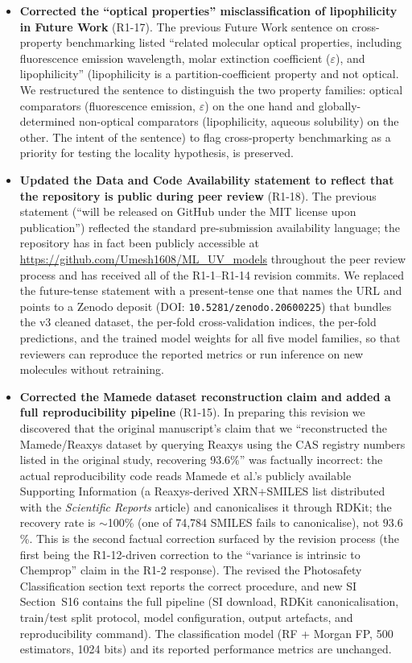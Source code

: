 \documentclass[11pt]{article}
\begin{document}
\begin{itemize}[leftmargin=2em]
 \item \textbf{Corrected the ``optical properties'' misclassification of lipophilicity in Future Work} (R1-17). The previous Future Work sentence on cross-property benchmarking listed ``related molecular optical properties, including fluorescence emission wavelength, molar extinction coefficient ($\varepsilon$), and lipophilicity'' (lipophilicity is a partition-coefficient property and not optical. We restructured the sentence to distinguish the two property families: optical comparators (fluorescence emission, $\varepsilon$) on the one hand and globally-determined non-optical comparators (lipophilicity, aqueous solubility) on the other. The intent of the sentence) to flag cross-property benchmarking as a priority for testing the locality hypothesis, is preserved.
  \item \textbf{Updated the Data and Code Availability statement to reflect that the repository is public during peer review} (R1-18). The previous statement (``will be released on GitHub under the MIT license upon publication'') reflected the standard pre-submission availability language; the repository has in fact been publicly accessible at \url{https://github.com/Umesh1608/ML_UV_models} throughout the peer review process and has received all of the R1-1--R1-14 revision commits. We replaced the future-tense statement with a present-tense one that names the URL and points to a Zenodo deposit (DOI: \texttt{10.5281/zenodo.20600225}) that bundles the v3 cleaned dataset, the per-fold cross-validation indices, the per-fold predictions, and the trained model weights for all five model families, so that reviewers can reproduce the reported metrics or run inference on new molecules without retraining.
  \item \textbf{Corrected the Mamede dataset reconstruction claim and added a full reproducibility pipeline} (R1-15). In preparing this revision we discovered that the original manuscript's claim that we ``reconstructed the Mamede/Reaxys dataset by querying Reaxys using the CAS registry numbers listed in the original study, recovering 93.6\%'' was factually incorrect: the actual reproducibility code reads Mamede et al.'s publicly available Supporting Information (a Reaxys-derived XRN+SMILES list distributed with the \emph{Scientific Reports} article) and canonicalises it through RDKit; the recovery rate is $\sim$100\% (one of 74{,}784 SMILES fails to canonicalise), not $93.6$\%. This is the second factual correction surfaced by the revision process (the first being the R1-12-driven correction to the ``variance is intrinsic to Chemprop'' claim in the R1-2 response). The revised the Photosafety Classification section text reports the correct procedure, and new SI Section~S16 contains the full pipeline (SI download, RDKit canonicalisation, train/test split protocol, model configuration, output artefacts, and reproducibility command). The classification model (RF + Morgan FP, 500 estimators, 1024 bits) and its reported performance metrics are unchanged.

\end{itemize}
\end{document}
